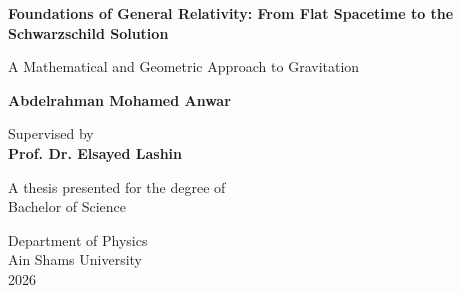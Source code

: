 \documentclass[11pt, a4paper]{report}
\begin{document}
\begin{titlepage}
    \begin{center}
        \vspace*{28.45pt}
            
        \Huge
        \textbf{Foundations of General Relativity: From Flat Spacetime to the Schwarzschild Solution}
            
        \vspace{14.23pt}
        \LARGE
        A Mathematical and Geometric Approach to Gravitation
            
        \vspace{42.68pt}
            
        \textbf{Abdelrahman Mohamed Anwar}
            
        \vspace{28.45pt}
        
        \Large
        Supervised by\\
        \textbf{Prof. Dr. Elsayed Lashin}
            
        \vfill
            
        \Large
        A thesis presented for the degree of\\
        Bachelor of Science
            
        \vspace{22.76pt}
            
        \Large
        Department of Physics\\
        Ain Shams University\\
        2026
            
    \end{center}
\end{titlepage}

\newpage
\thispagestyle{empty}

\begin{abstract}
This thesis provides a comprehensive, mathematically rigorous review of General Relativity, tracing the theoretical development from the postulates of flat spacetime to the exact solutions of Einstein's field equations. We begin by formalizing Special Relativity using four-vector formalism and analyzing causality through the light cone structure. The mathematical framework of pseudo-Riemannian manifolds, tensor calculus, and differential forms is then systematically developed to describe curved spacetime. Utilizing the Einstein Equivalence Principle and minimal coupling, we derive the geodesic equation and Einstein's field equations, including discussions on the Newtonian limit, the Hilbert action, and the various energy conditions. Finally, we rigorously derive the Schwarzschild solution for a static, spherically symmetric vacuum. The causal structure of the Schwarzschild black hole is examined using Eddington-Finkelstein coordinates, and the classical experimental tests of General Relativity—specifically the precession of the perihelion and gravitational redshift—are analyzed. This work serves as a foundational synthesis of the geometric approach to gravitation, establishing the necessary groundwork for advanced studies in theoretical cosmology and high-energy physics.
\end{abstract}
\end{document}
